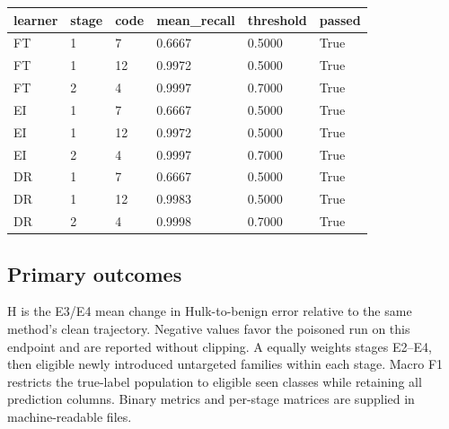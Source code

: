 \documentclass[
  10pt,
  a4paper,
]{article}
\begin{document}
\begin{longtable}[]{@{}llllll@{}}
\toprule
learner & stage & code & mean\_recall & threshold & passed \\
\midrule
\endhead
FT & 1 & 7 & 0.6667 & 0.5000 & True \\
FT & 1 & 12 & 0.9972 & 0.5000 & True \\
FT & 2 & 4 & 0.9997 & 0.7000 & True \\
EI & 1 & 7 & 0.6667 & 0.5000 & True \\
EI & 1 & 12 & 0.9972 & 0.5000 & True \\
EI & 2 & 4 & 0.9997 & 0.7000 & True \\
DR & 1 & 7 & 0.6667 & 0.5000 & True \\
DR & 1 & 12 & 0.9983 & 0.5000 & True \\
DR & 2 & 4 & 0.9998 & 0.7000 & True \\
\bottomrule
\end{longtable}

\hypertarget{primary-outcomes}{%
\subsection{Primary outcomes}\label{primary-outcomes}}

H is the E3/E4 mean change in Hulk-to-benign error relative to the same
method's clean trajectory. Negative values favor the poisoned run on
this endpoint and are reported without clipping. A equally weights
stages E2--E4, then eligible newly introduced untargeted families within
each stage. Macro F1 restricts the true-label population to eligible
seen classes while retaining all prediction columns. Binary metrics and
per-stage matrices are supplied in machine-readable files.
\end{document}
